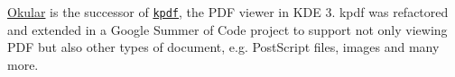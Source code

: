 \hyperlink{namespaceOkular}{Okular} is the successor of \href{http://kpdf.kde.org}{\tt kpdf}, the P\+D\+F viewer in K\+D\+E 3. kpdf was refactored and extended in a Google Summer of Code project to support not only viewing P\+D\+F but also other types of document, e.\+g. Post\+Script files, images and many more. 